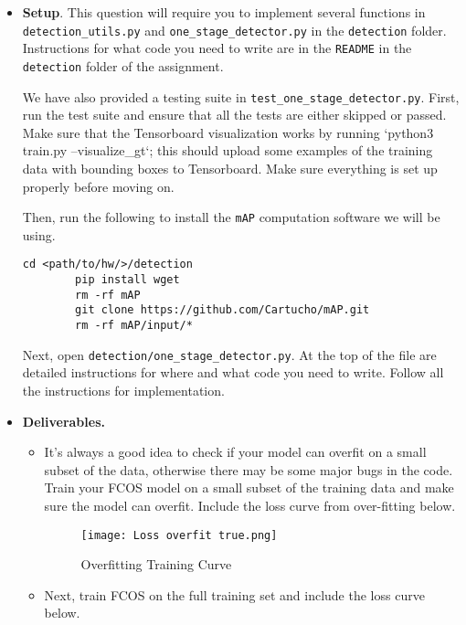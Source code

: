 \documentclass[11pt,addpoints,answers]{exam}
\numberwithin{equation}{section} %
\numberwithin{figure}{section} %
\numberwithin{table}{section} %
\begin{document}
\begin{itemize}
    \item \textbf{Setup}. This question will require you to implement several functions in \texttt{detection\_utils.py} and \texttt{one\_stage\_detector.py} in the \texttt{detection} folder. Instructions for what code you need to write are in the \texttt{README} in the \texttt{detection} folder of the assignment.
    
    We have also provided a testing suite in \texttt{test\_one\_stage\_detector.py}. First, run the test suite
    and ensure that all the tests are either skipped or passed. Make sure that the Tensorboard visualization works by running `python3 train.py --visualize\_gt`; this should upload some examples of the training data with bounding boxes to Tensorboard. Make sure everything is set up properly before moving on.

    Then, run the following to install the \texttt{mAP} computation software we will be using.
    \begin{lstlisting}[language=Shell]
        cd <path/to/hw/>/detection
        pip install wget  
        rm -rf mAP
        git clone https://github.com/Cartucho/mAP.git
        rm -rf mAP/input/*
    \end{lstlisting}

    Next, open \texttt{detection/one\_stage\_detector.py}. At the top of the file are detailed
    instructions for where and what code you need to write. Follow all the instructions for implementation. 

    \item \textbf{Deliverables.}
    \begin{itemize}
        \item It's always a good idea to check if your model can overfit on a small subset of the data, otherwise there may be some major bugs in the code. Train your FCOS model on a small subset of the training data and make sure the model can overfit. Include the loss curve from over-fitting below.

        \begin{figure}[H]
            \centering
            \texttt{[image: Loss overfit true.png]}
            \caption{Overfitting Training Curve}
            \label{fig:overfit_plot}
        \end{figure}
        
        \item Next, train FCOS on the full training set and include the loss curve below.


\end{itemize}
\end{itemize}
\end{document}
